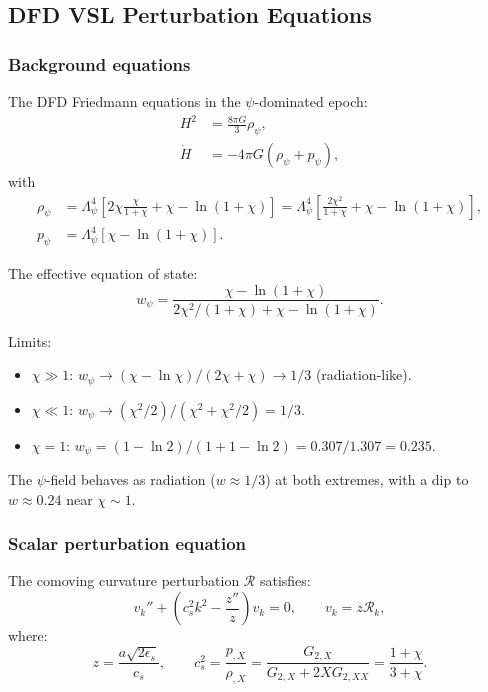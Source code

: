\documentclass[11pt,a4paper]{article}
\begin{document}
\subsection{DFD VSL Perturbation Equations}

\subsubsection{Background equations}

The DFD Friedmann equations in the $\psi$-dominated epoch:
\begin{align}
H^2 &= \frac{8\pi G}{3}\rho_\psi, \\
\dot H &= -4\pi G(\rho_\psi + p_\psi),
\end{align}
with
\begin{align}
\rho_\psi &= \Lambda_\psi^4\left[2\chi\frac{\chi}{1+\chi} + \chi - \ln(1+\chi)\right] = \Lambda_\psi^4\left[\frac{2\chi^2}{1+\chi} + \chi - \ln(1+\chi)\right], \\
p_\psi &= \Lambda_\psi^4\left[\chi - \ln(1+\chi)\right].
\end{align}

The effective equation of state:
\begin{equation}
w_\psi = \frac{\chi - \ln(1+\chi)}{2\chi^2/(1+\chi) + \chi - \ln(1+\chi)}.
\end{equation}

Limits:
\begin{itemize}
\item $\chi \gg 1$: $w_\psi \to (\chi - \ln\chi)/(2\chi + \chi) \to 1/3$ (radiation-like).
\item $\chi \ll 1$: $w_\psi \to (\chi^2/2)/(\chi^2 + \chi^2/2) = 1/3$.
\item $\chi = 1$: $w_\psi = (1 - \ln 2)/(1 + 1 - \ln 2) = 0.307/1.307 = 0.235$.
\end{itemize}

The $\psi$-field behaves as radiation ($w \approx 1/3$) at both extremes, with a dip to $w \approx 0.24$ near $\chi \sim 1$.

\subsubsection{Scalar perturbation equation}

The comoving curvature perturbation $\mathcal{R}$ satisfies:
\begin{equation}\label{eq:Mukhanov}
v_k'' + \left(c_s^2 k^2 - \frac{z''}{z}\right)v_k = 0, \qquad v_k = z\mathcal{R}_k,
\end{equation}
where:
\begin{equation}
z = \frac{a\sqrt{2\epsilon_s}}{c_s}, \qquad c_s^2 = \frac{p_{,X}}{\rho_{,X}} = \frac{G_{2,X}}{G_{2,X} + 2XG_{2,XX}} = \frac{1+\chi}{3+\chi}.
\end{equation}
\end{document}
